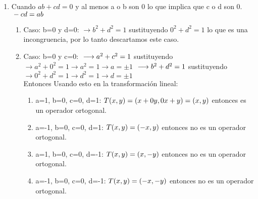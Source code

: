 \documentclass{book}
\begin{document}
\begin{enumerate}
    \item Cuando $ab+cd=0$ y al menos a o b son 0 lo que implica que c o d son 0. 
    $\\-cd=ab$
    \begin{enumerate}
        \item Caso: b=0 y d=0:
        $\longrightarrow b^2+d^2=1$ sustituyendo $0^2+d^2=1$ lo que es una incongruencia, por lo tanto descartamos este caso.
        \item Caso: b=0 y c=0:
        $\\\longrightarrow a^2+c^2=1$ sustituyendo $\longrightarrow a^2+0^2=1 \longrightarrow a^2=1 \longrightarrow a=\pm1$
        $\\\longrightarrow b^2+d^2=1$ sustituyendo $\longrightarrow 0^2+d^2=1 \longrightarrow d^2=1 \longrightarrow d=\pm1$
        \\Entonces Usando esto en la transformación lineal:
        \begin{enumerate}
            \item a=1, b=0, c=0, d=1:
            $\\T(x,y)=(x+0y,0x+y)=(x,y)$ entonces es un operador ortogonal.
            \item a=-1, b=0, c=0, d=1:
            $\\T(x,y)=(-x,y)$ entonces no es un operador ortogonal.
            \item a=1, b=0, c=0, d=-1:
            $\\T(x,y)=(x,-y)$ entonces no es un operador ortogonal.
            \item a=-1, b=0, c=0, d=-1:
            $\\T(x,y)=(-x,-y)$ entonces no es un operador ortogonal.
            
        \end{enumerate}
        

\end{enumerate}
\end{enumerate}
\end{document}

